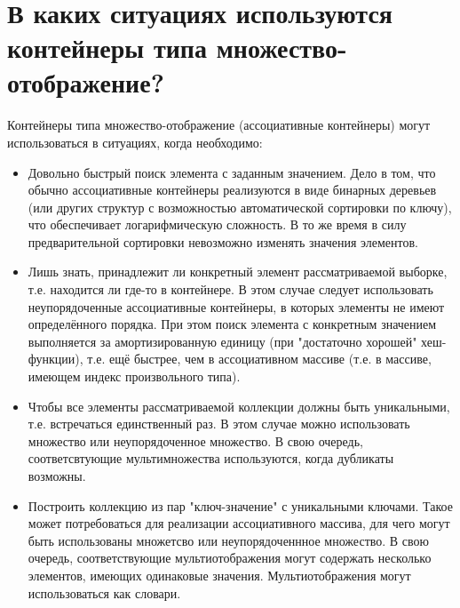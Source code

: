 \documentclass[a4paper,12pt]{article}	%
\title{
	\center{\textbf{Контрольные вопросы. Задание 15.}}
	}
\begin{document}

\maketitle

\section{В каких ситуациях используются контейнеры типа множество-отображение?}

	Контейнеры типа множество-отображение (ассоциативные контейнеры) могут использоваться в ситуациях, когда необходимо:
	
	\begin{itemize}
	
		\item Довольно быстрый поиск элемента с заданным значением. Дело в том, что обычно ассоциативные контейнеры реализуются в виде бинарных деревьев (или других структур с возможностью автоматической сортировки по ключу), что обеспечивает логарифмическую сложность. В то же время в силу предварительной сортировки	невозможно изменять значения элементов.

		\item Лишь знать, принадлежит ли конкретный элемент рассматриваемой выборке, т.е. находится ли где-то в контейнере. В этом случае следует использовать неупорядоченные ассоциативные контейнеры, в которых элементы не имеют определённого порядка. При этом поиск элемента с конкретным значением выполняется за амортизированную единицу (при "достаточно хорошей" хеш-функции), т.е. ещё быстрее, чем в ассоциативном массиве (т.е. в массиве, имеющем индекс произвольного типа).
		
		\item Чтобы все элементы рассматриваемой коллекции должны быть уникальными, т.е. встречаться единственный раз. В этом случае можно использовать множество или неупорядоченное множество. В свою очередь, соответсвтующие мультимножества используются, когда дубликаты возможны.
		
		\item Построить коллекцию из пар "ключ-значение" с уникальными ключами. Такое может потребоваться для реализации ассоциативного массива, для чего могут быть использованы множетсво или неупорядоченнное множество. В свою очередь, соответствующие мультиотображения могут содержать несколько элементов, имеющих одинаковые значения. Мультиотображения могут использоваться как словари.
	
	\end{itemize}
\end{document}
